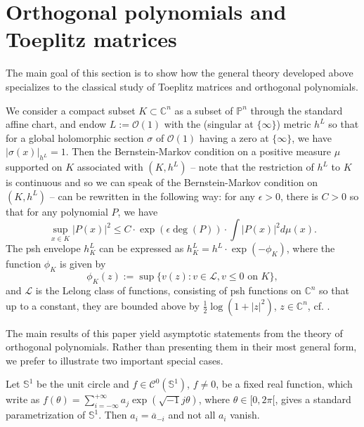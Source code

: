 \documentclass[12pt]{article}
\numberwithin{equation}{section}
\theoremstyle{theorem}
\theoremstyle{definition}
\theoremstyle{remark}
\newcommand{\imun} {\sqrt{-1}}
\newcommand{\comp}{\mathbb{C}}
\newcommand{\ccal}{\mathscr{C}}
\begin{document}
	\section{Orthogonal polynomials and Toeplitz matrices}\label{sect_mat}
	The main goal of this section is to show how the general theory developed above specializes to the classical study of Toeplitz matrices and orthogonal polynomials. 
	\par 
	We consider a compact subset $K \subset \comp^n$ as a subset of $\mathbb{P}^n$ through the standard affine chart, and endow $L := \mathscr{O}(1)$ with the (singular at $\{ \infty \}$) metric $h^L$ so that for a global holomorphic section $\sigma$ of $\mathscr{O}(1)$ having a zero at $\{ \infty \}$, we have $|\sigma(x)|_{h^L} = 1$. 
	Then the Bernstein-Markov condition on a positive measure $\mu$ supported on $K$ associated with $(K, h^L)$ -- note that the restriction of $h^L$ to $K$ is continuous and so we can speak of the Bernstein-Markov condition on $(K, h^L)$ -- can be rewritten in the following way: for any $\epsilon > 0$, there is $C > 0$ so that for any polynomial $P$, we have
	\begin{equation}\label{eq_bm_clas0}
		\sup_{x \in K} |P(x)|^2
		\leq
		C
		\cdot
		\exp(\epsilon \deg(P))
		\cdot
		\int |P(x)|^2 d \mu(x).
	\end{equation}
	The psh envelope $h^L_K$ can be expressed as $h^L_K = h^L \cdot \exp(-\phi_K)$, where the function $\phi_K$ is given by
	\begin{equation}
		\phi_K(z) := \sup \{ v(z) : v \in \mathcal{L}, v \leq 0 \text{ on } K \},
	\end{equation}
	and $\mathcal{L}$ is the Lelong class of functions, consisting of psh functions on $\comp^n$ so that up to a constant, they are bounded above by $\frac{1}{2} \log (1 + |z|^2)$, $z \in \comp^n$, cf. \cite[Example 1.2]{GuedZeriGeomAnal}.
	\par 
	The main results of this paper yield asymptotic statements from the theory of orthogonal polynomials.  
	Rather than presenting them in their most general form, we prefer to illustrate two important special cases.
	\par 
	Let $\mathbb{S}^1$ be the unit circle and $f \in \ccal^0(\mathbb{S}^1)$, $f \neq 0$, be a fixed real function, which write as $f(\theta) = \sum_{i = - \infty}^{+ \infty} a_j \exp(\imun j \theta)$, where $\theta \in [0, 2 \pi[$, gives a standard parametrization of $\mathbb{S}^1$. 
	Then $a_i = \overline{a}_{-i}$ and not all $a_i$ vanish.
	\par 
\end{document}
